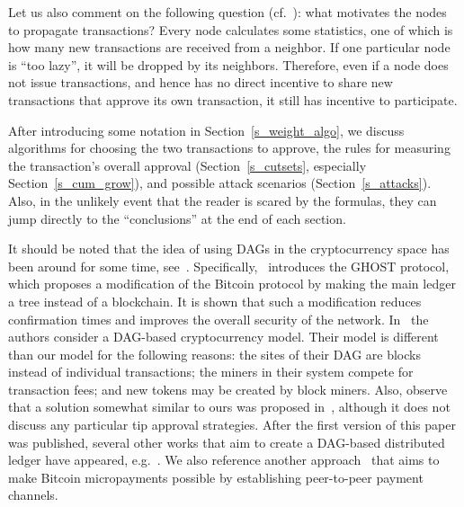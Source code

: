 \documentclass[12pt]{article}
\begin{document}
Let us also comment on the following question (cf.\ \cite{red_balloons}):
what motivates the nodes to propagate transactions? 
Every node calculates some statistics, one of which is how many new
transactions are received from a neighbor.
If one particular node is ``too lazy'', it will be dropped by its neighbors.
Therefore, even if a node does not issue transactions, and hence has no direct 
incentive to share new transactions that approve its own transaction, it still has
incentive to participate. 

After introducing some
notation in Section~\ref{s_weight_algo},
we discuss algorithms for choosing the two transactions to approve, 
the rules for measuring the transaction's overall approval
(Section~\ref{s_cutsets}, especially Section~\ref{s_cum_grow}), 
and possible
attack scenarios (Section~\ref{s_attacks}). 
Also, in the unlikely
event that the reader is scared by the formulas, they can jump 
directly to the ``conclusions'' at the end 
of each section.

It should be noted that 
the idea
of using DAGs in the cryptocurrency 
space has been around for some time, see~\cite{dag_generalized_blockchain, dagcoin, SZ, LSZ, braids}.
Specifically,~\cite{SZ} introduces the 
GHOST protocol, which proposes a modification 
of the Bitcoin protocol by making the main ledger a tree 
instead of a blockchain. 
It is shown that such a 
modification 
reduces 
confirmation times
and improves the overall security of the network. 
In~\cite{LSZ} the authors consider 
a DAG-based cryptocurrency model. 
Their model is different than
our model for the following reasons: the sites of 
their DAG are blocks instead of individual transactions; 
the miners in their system compete for transaction fees; 
and 
new tokens may be created by block miners. 
Also, observe that
a solution somewhat similar to ours was proposed in~\cite{dagcoin}, although it does not 
discuss any particular tip approval strategies.
After the first version of this paper was published,
several other works 
that aim to create a DAG-based distributed ledger have appeared,
e.g.~\cite{SZ_SPECTRE}.
We 
also reference another approach~\cite{bitcoinj,lightning} 
that aims to make Bitcoin
 micropayments possible by establishing peer-to-peer
payment channels. 
\end{document}

